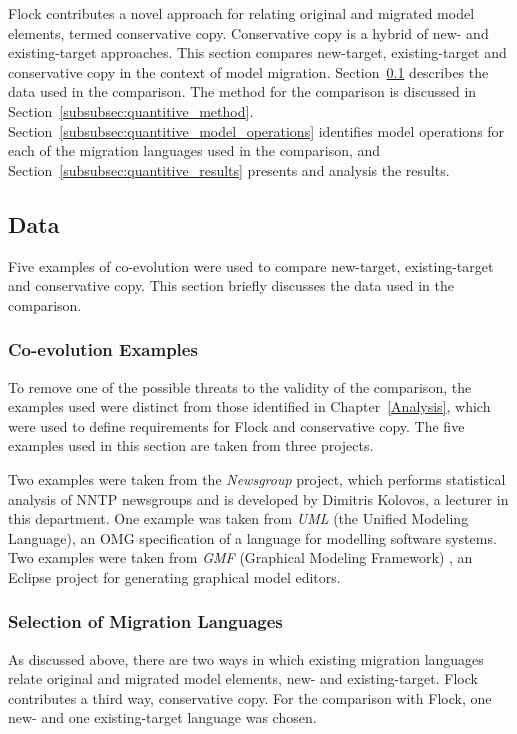 Flock contributes a novel approach for relating original and migrated model elements, termed conservative copy. Conservative copy is a hybrid of new- and existing-target approaches. This section compares new-target, existing-target and conservative copy in the context of model migration. Section~\ref{subsubsec:quantitive_data} describes the data used in the comparison. The method for the comparison is discussed in Section~\ref{subsubsec:quantitive_method}. Section~\ref{subsubsec:quantitive_model_operations} identifies model operations for each of the migration languages used in the comparison, and Section~\ref{subsubsec:quantitive_results} presents and analysis the results.

\subsection{Data}
\label{subsubsec:quantitive_data}
Five examples of co-evolution were used to compare new-target, existing-target and conservative copy. This section briefly discusses the data used in the comparison.

\subsubsection{Co-evolution Examples}
To remove one of the possible threats to the validity of the comparison, the examples used were distinct from those identified in Chapter~\ref{Analysis}, which were used to define requirements for Flock and conservative copy. The five examples used in this section are taken from three projects.

Two examples were taken from the \emph{Newsgroup} project, which performs statistical analysis of NNTP newsgroups and is developed by Dimitris Kolovos, a lecturer in this department. One example was taken from \emph{UML} (the Unified Modeling Language), an OMG specification of a language for modelling software systems. Two examples were taken from \emph{GMF} (Graphical Modeling Framework) \cite{gronback09emp}, an Eclipse project for generating graphical model editors.

\subsubsection{Selection of Migration Languages}
As discussed above, there are two ways in which existing migration languages relate original and migrated model elements, new- and existing-target. Flock contributes a third way, conservative copy. For the comparison with Flock, one new- and one existing-target language was chosen.

